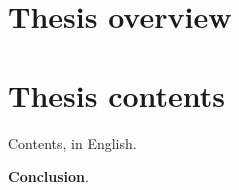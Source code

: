 \newpage

\section*{Thesis overview}

\newcommand{\actualityEN}{\underline{\textbf{\actualityTXTEN}}}
\newcommand{\progressEN}{\underline{\textbf{\progressTXTEN}}}
\newcommand{\aimEN}{\underline{{\textbf\aimTXTEN}}}
\newcommand{\tasksEN}{\underline{\textbf{\tasksTXTEN}}}
\newcommand{\noveltyEN}{\underline{\textbf{\noveltyTXTEN}}}
\newcommand{\influenceEN}{\underline{\textbf{\influenceTXTEN}}}
\newcommand{\influenceTheorEN}{\underline{\textbf{\influenceTheorTXTEN}}}
\newcommand{\methodsEN}{\underline{\textbf{\methodsTXTEN}}}
\newcommand{\defpositionsEN}{\underline{\textbf{\defpositionsTXTEN}}}
\newcommand{\reliabilityEN}{\underline{\textbf{\reliabilityTXTEN}}}
\newcommand{\probationEN}{\underline{\textbf{\probationTXTEN}}}
\newcommand{\contributionEN}{\underline{\textbf{\contributionTXTEN}}}
\newcommand{\publicationsEN}{\underline{\textbf{\publicationsTXTEN}}}
\newcommand{\researchObjectEN}{\underline{\textbf{\researchObjectTXTEN}}}
\newcommand{\researchSubjectEN}{\underline{\textbf{\researchSubjectTXTEN}}}
\newcommand{\deploymentEN}{\underline{\textbf{\deploymentTXTEN}}}
\newcommand{\thesisstructureEN}{\underline{\textbf{\thesisstructureTXTEN}}}




\section*{Thesis contents}
Contents, in English.

\textbf{Conclusion}.




